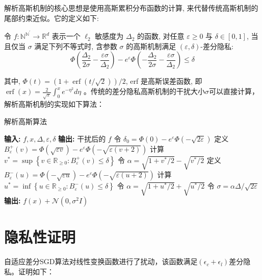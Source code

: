 解析高斯机制的核心思想是使用高斯累积分布函数的计算, 来代替传统高斯机制的尾部约束近似。它的定义如下:
\begin{define}\label{解析高斯机制}
令 $f: \mathbb{N}^{\mathbb{N}^{\prime}} \rightarrow \mathbb{R}^{d}$ 表示一个 $\ell_{2}$ 敏感度为 $\Delta_{2}$ 的函数, 对任意 $\varepsilon \geq 0$ 与 $\delta \in[0,1]$, 当且仅当 $\sigma$ 满足下列不等式时, 含参数 $\sigma$ 的高斯机制满足 $(\varepsilon, \delta)$-差分隐私:
\begin{equation}\label{eq:解析高斯机制}
\Phi\left(\frac{\Delta_{2}}{2 \sigma}-\frac{\varepsilon \sigma}{\Delta_{2}}\right)-e^{\varepsilon} \Phi\left(-\frac{\Delta_{2}}{2 \sigma}-\frac{\varepsilon \sigma}{\Delta_{2}}\right) \leq \delta
\end{equation}
\end{define}

其中, $\Phi(t)=(1+\operatorname{erf}(t / \sqrt{2})) / 2$, erf 是高斯误差函数, 即 $\operatorname{erf}(x)=\frac{2}{\sqrt{\pi}} \int_{0}^{x} e^{-\eta^{2}} d \eta$ 。传统的差分隐私高斯机制的干扰大小$\sigma$可以直接计算，解析高斯机制的实现如下算法：

\begin{algorithm}[!htb]
	\caption{解析高斯算法}
	\label{解析高斯算法}
	\begin{algorithmic}[1]
		\footnotesize
		\STATE \textbf{输入:} $f, x, \Delta, \varepsilon, \delta$
		\STATE \textbf{输出:} 干扰后的 $f$
		\STATE 令 $\delta_{0}=\Phi(0)-e^{\varepsilon} \Phi(-\sqrt{2 \varepsilon})$
			\STATE 定义 $B_{\varepsilon}^{+}(v)=\Phi(\sqrt{\varepsilon v})-e^{\varepsilon} \Phi(-\sqrt{\varepsilon(v+2)})$
			\STATE 计算 $v^{*}=\sup \left\{v \in \mathbb{R}_{\geq 0}: B_{\varepsilon}^{+}(v) \leq \delta\right\}$
            \STATE 令 $\alpha=\sqrt{1+v^{*} / 2}-\sqrt{v^{*} / 2}$
        \ELSE
        	\STATE 定义 $B_{\varepsilon}^{-}(u)=\Phi(-\sqrt{\varepsilon u})-e^{\varepsilon} \Phi(-\sqrt{\varepsilon(u+2)})$
        	\STATE 计算 $u^{*}=\inf \left\{u \in \mathbb{R}_{\geq 0}: B_{\varepsilon}^{-}(u) \leq \delta\right\}$
        	\STATE 令 $\alpha=\sqrt{1+u^{*} / 2}+\sqrt{u^{*} / 2}$
        \ENDIF
    	\STATE 令 $\sigma=\alpha \Delta / \sqrt{2 \varepsilon}$
    	\STATE \textbf{输出:} $f(x)+\mathcal{N}\left(0, \sigma^{2} I\right)$
	\end{algorithmic}
\end{algorithm}


\section{隐私性证明}
自适应差分SGD算法对线性变换函数进行了扰动，该函数满足$\left(\epsilon_{c}+\epsilon_{l}\right)$差分隐私。证明如下：

